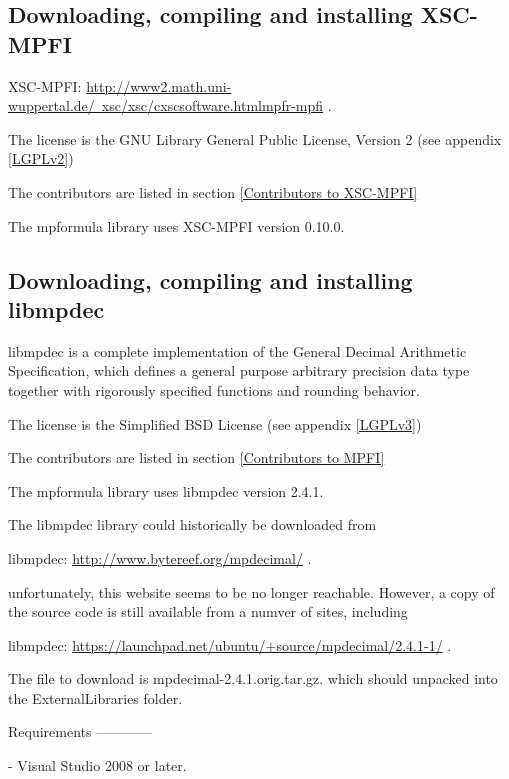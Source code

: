\subsection{Downloading, compiling and installing XSC-MPFI}
XSC-MPFI: \href{http://www2.math.uni-wuppertal.de/~xsc/xsc/cxsc_software.html#mpfr-mpfi}{http://www2.math.uni-wuppertal.de/~xsc/xsc/cxscsoftware.htmlmpfr-mpfi} . 

The license is the GNU Library General Public License, Version 2 (see appendix \ref{LGPLv2})

The contributors are listed in section \ref{Contributors to XSC-MPFI}

The mpformula library uses XSC-MPFI version 0.10.0.



\subsection{Downloading, compiling and installing libmpdec}

libmpdec is a complete implementation of the General Decimal Arithmetic Specification, which defines a general purpose arbitrary precision data type together with rigorously specified functions and rounding behavior. 

\vpara
The license is the  Simplified BSD License (see appendix \ref{LGPLv3})

The contributors are listed in section \ref{Contributors to MPFI}

The mpformula library uses libmpdec version 2.4.1.

\vpara
The libmpdec library could historically be downloaded from

\vpara
libmpdec: \href{http://www.bytereef.org/mpdecimal/}{http://www.bytereef.org/mpdecimal/} . 

unfortunately, this website seems to be no longer reachable. However, a copy of the source code is still available from a numver of sites, including

\vpara
libmpdec: \href{https://launchpad.net/ubuntu/+source/mpdecimal/2.4.1-1}{https://launchpad.net/ubuntu/+source/mpdecimal/2.4.1-1/} . 




\vpara
The file to download is mpdecimal-2.4.1.orig.tar.gz. which should unpacked into the ExternalLibraries folder.


\vpara
Requirements
------------

- Visual Studio 2008 or later.

